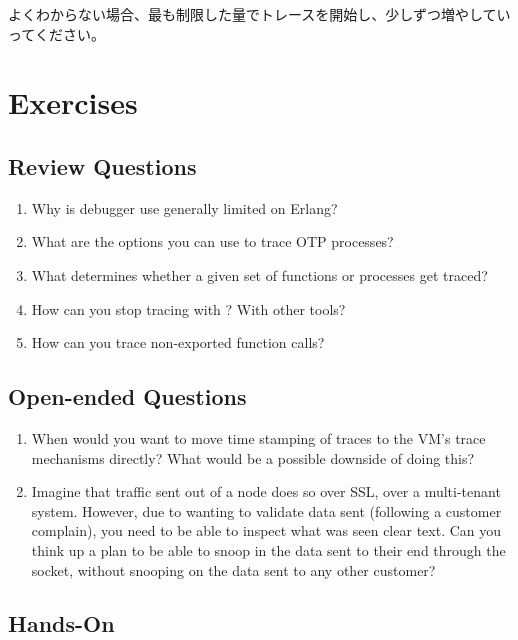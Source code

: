 よくわからない場合、最も制限した量でトレースを開始し、少しずつ増やしていってください。

\section{Exercises}

\subsection*{Review Questions}

\begin{enumerate}
	\item Why is debugger use generally limited on Erlang?
	\item What are the options you can use to trace OTP processes?
	\item What determines whether a given set of functions or processes get traced?
	\item How can you stop tracing with ? With other tools?
	\item How can you trace non-exported function calls?
\end{enumerate}

\subsection*{Open-ended Questions}

\begin{enumerate}
	\item When would you want to move time stamping of traces to the VM's trace mechanisms directly? What would be a possible downside of doing this?	
	\item Imagine that traffic sent out of a node does so over SSL, over a multi-tenant system. However, due to wanting to validate data sent (following a customer complain), you need to be able to inspect what was seen clear text. Can you think up a plan to be able to snoop in the data sent to their end through the  socket, without snooping on the data sent to any other customer?
\end{enumerate}

\subsection*{Hands-On}

